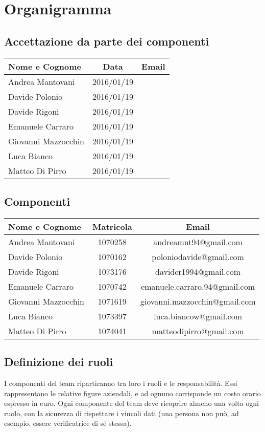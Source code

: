 \section*{Organigramma} %
\subsection*{Accettazione da parte dei componenti}
\begin{center}
  \begin{tabular}{ l | c | c }
    \hline
    \textbf{Nome e Cognome} & \textbf{Data} & \textbf{Email} \\
    \hline
    Andrea Mantovani & 2016/01/19 &  \\ \hline
    Davide Polonio & 2016/01/19 &  \\ \hline
    Davide Rigoni & 2016/01/19 &  \\ \hline
    Emanuele Carraro & 2016/01/19 &  \\ \hline
    Giovanni Mazzocchin & 2016/01/19 &  \\ \hline
    Luca Bianco & 2016/01/19 &  \\ \hline
    Matteo Di Pirro & 2016/01/19 &  \\
    \hline
  \end{tabular}
\end{center}


\subsection*{Componenti}
\begin{center}
  \begin{tabular}{ l | c | c }
    \hline
    \textbf{Nome e Cognome} & \textbf{Matricola} & \textbf{Email} \\
    \hline
    Andrea Mantovani & 1070258 & andreamnt94@gmail.com \\ \hline
    Davide Polonio & 1070162 & poloniodavide@gmail.com \\ \hline
    Davide Rigoni & 1073176 & davider1994@gmail.com \\ \hline
    Emanuele Carraro & 1070742 & emanuele.carraro.94@gmail.com \\ \hline
    Giovanni Mazzocchin & 1071619 & giovanni.mazzocchin@gmail.com \\ \hline
    Luca Bianco & 1073397 & luca.biancow@gmail.com \\ \hline
    Matteo Di Pirro & 1074041 & matteodipirro@gmail.com \\
    \hline
  \end{tabular}
\end{center}



\subsection*{Definizione dei ruoli}
I componenti del team ripartiranno tra loro i ruoli e le responsabilità. Essi rappresentano le relative figure aziendali, e ad ognuno corrisponde un costo orario espresso in euro.
Ogni componente del team deve ricoprire almeno una volta ogni ruolo, con la sicurezza di rispettare i vincoli dati (una persona non può, ad esempio, essere verificatrice di sé stessa).
